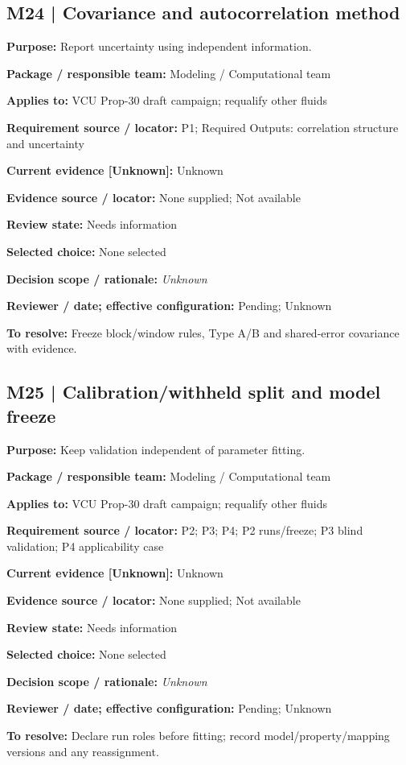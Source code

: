\documentclass[11pt]{article}
\begin{document}
\begin{minipage}{\textwidth}\small\setlength{\parskip}{2pt}
\subsection*{M24 | Covariance and autocorrelation method}
\textbf{Purpose:} Report uncertainty using independent information.\par
\textbf{Package / responsible team:} Modeling / Computational team\par
\textbf{Applies to:} VCU Prop-30 draft campaign; requalify other fluids\par
\textbf{Requirement source / locator:} P1; Required Outputs: correlation structure and uncertainty\par
\textbf{Current evidence [Unknown]:} Unknown\par
\textbf{Evidence source / locator:} None supplied; Not available\par
\textbf{Review state:} Needs information\par
\textbf{Selected choice:} None selected\par
\textbf{Decision scope / rationale:} \textit{Unknown}\par
\textbf{Reviewer / date; effective configuration:} Pending; Unknown\par
\textbf{To resolve:} Freeze block/window rules, Type A/B and shared-error covariance with evidence.\par
\end{minipage}\par\vspace{5pt}
\begin{minipage}{\textwidth}\small\setlength{\parskip}{2pt}
\subsection*{M25 | Calibration/withheld split and model freeze}
\textbf{Purpose:} Keep validation independent of parameter fitting.\par
\textbf{Package / responsible team:} Modeling / Computational team\par
\textbf{Applies to:} VCU Prop-30 draft campaign; requalify other fluids\par
\textbf{Requirement source / locator:} P2; P3; P4; P2 runs/freeze; P3 blind validation; P4 applicability case\par
\textbf{Current evidence [Unknown]:} Unknown\par
\textbf{Evidence source / locator:} None supplied; Not available\par
\textbf{Review state:} Needs information\par
\textbf{Selected choice:} None selected\par
\textbf{Decision scope / rationale:} \textit{Unknown}\par
\textbf{Reviewer / date; effective configuration:} Pending; Unknown\par
\textbf{To resolve:} Declare run roles before fitting; record model/property/mapping versions and any reassignment.\par
\end{minipage}\par\vspace{5pt}
\end{document}

